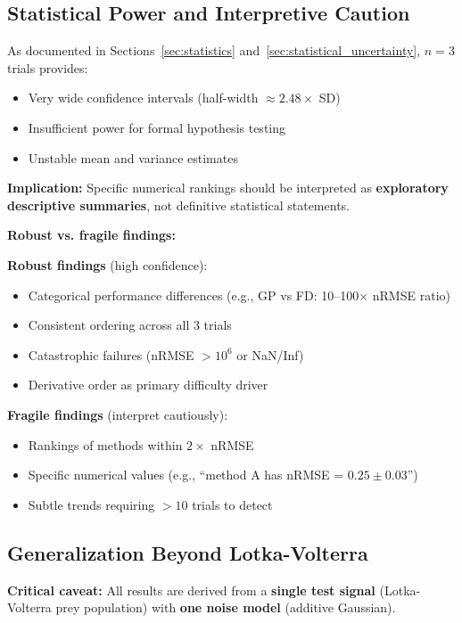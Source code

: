 \subsection{Statistical Power and Interpretive Caution}
\label{sec:statistical_power}

As documented in Sections~\ref{sec:statistics} and~\ref{sec:statistical_uncertainty}, $n=3$ trials provides:
\begin{itemize}
    \item Very wide confidence intervals (half-width $\approx 2.48 \times$ SD)
    \item Insufficient power for formal hypothesis testing
    \item Unstable mean and variance estimates
\end{itemize}

\textbf{Implication:} Specific numerical rankings should be interpreted as \textbf{exploratory descriptive summaries}, not definitive statistical statements.

\textbf{Robust vs. fragile findings:}

\textbf{Robust findings} (high confidence):
\begin{itemize}
    \item Categorical performance differences (e.g., GP vs FD: 10--100$\times$ nRMSE ratio)
    \item Consistent ordering across all 3 trials
    \item Catastrophic failures (nRMSE $> 10^6$ or NaN/Inf)
    \item Derivative order as primary difficulty driver
\end{itemize}

\textbf{Fragile findings} (interpret cautiously):
\begin{itemize}
    \item Rankings of methods within $2\times$ nRMSE
    \item Specific numerical values (e.g., ``method A has nRMSE = $0.25 \pm 0.03$'')
    \item Subtle trends requiring $>10$ trials to detect
\end{itemize}

\subsection{Generalization Beyond Lotka-Volterra}
\label{sec:generalization}

\textbf{Critical caveat:} All results are derived from a \textbf{single test signal} (Lotka-Volterra prey population) with \textbf{one noise model} (additive Gaussian).

